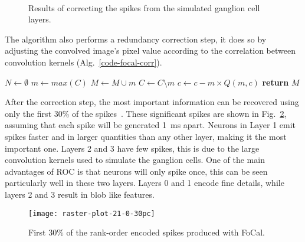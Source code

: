 {\begin{figure}[hbt]
  \centering
  \\
  \caption{Results of correcting the spikes from the simulated ganglion cell layers.}
  \label{fig-convolution-results}
\end{figure}
The algorithm also performs a redundancy correction step, it does so by 
adjusting the convolved image's pixel value according to the correlation 
between convolution kernels (Alg.~\ref{code-focal-corr}).
\begin{algorithm}[h]
  \caption{FoCal, Part 2}
  \label{code-focal-corr}
  \begin{algorithmic}
    \State $N \leftarrow \emptyset$ 
    \Repeat
    \State $m \leftarrow max(C)$
    \State $M \leftarrow M \cup m$
    \State $C \leftarrow C \setminus m$
     
     
    \State $c \leftarrow c - m \times Q(m, c)$
    \EndIf
    \EndFor
    \State \textbf{return} $M$
    \EndProcedure
  \end{algorithmic}
\end{algorithm}

After the correction step, the most important information can be recovered using only the first 30\% of the spikes~\citep{sen2009evaluating}. These significant spikes are shown in Fig.~\ref{fig-raster-plot-30pc}, assuming that each spike will be generated 1~ms apart. Neurons in Layer 1 emit spikes faster and in larger quantities than any other layer, making it the most important one. Layers 2 and 3 have few spikes, this is due to the large convolution kernels used to simulate the ganglion cells. One of the main advantages of ROC is that neurons will only spike once, this can be seen particularly well in these two layers. Layers 0 and 1 encode fine details, while layers 2 and 3 result in blob like features.
\begin{figure}[hbt]
  \centering
      \texttt{[image: raster-plot-21-0-30pc]}
      \caption{First 30\% of the rank-order encoded spikes produced with FoCal.}
      \label{fig-raster-plot-30pc}
\end{figure}

}

